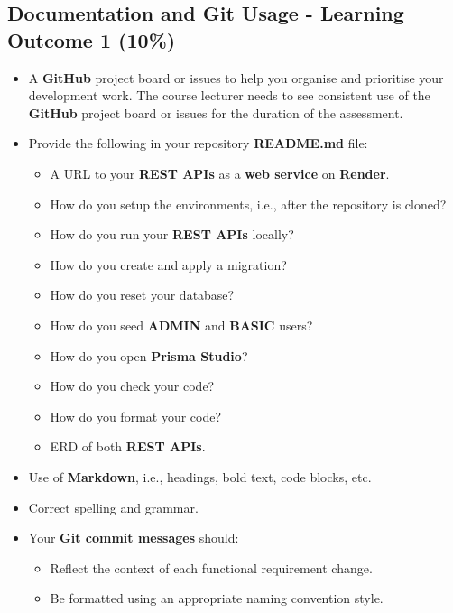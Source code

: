 \documentclass{article}
\begin{document}
\subsection*{Documentation and Git Usage - Learning Outcome 1 (10\%)}
\begin{itemize}
	\item A \textbf{GitHub} project board or issues to help you organise and prioritise your development work. The course lecturer needs to see consistent use of the \textbf{GitHub} project board or issues for the duration of the assessment.
    \item Provide the following in your repository \textbf{README.md} file:
    \begin{itemize} 
	\item A URL to your \textbf{REST APIs} as a \textbf{web service} on \textbf{Render}.
      \item How do you setup the environments, i.e., after the repository is cloned?
	  \item How do you run your \textbf{REST APIs} locally?
	  \item How do you create and apply a migration?  
	  \item How do you reset your database?
	  \item How do you seed \textbf{ADMIN} and \textbf{BASIC} users?
	  \item How do you open \textbf{Prisma Studio}?
	  \item How do you check your code?
	  \item How do you format your code?
	  \item ERD of both \textbf{REST APIs}.
    \end{itemize}
    \item Use of \textbf{Markdown}, i.e., headings, bold text, code blocks, etc.
    \item Correct spelling and grammar.
    \item Your \textbf{Git commit messages} should:
    \begin{itemize}
      \item Reflect the context of each functional requirement change.
      \item Be formatted using an appropriate naming convention style.
    \end{itemize}	
\end{itemize} 
\end{document}

